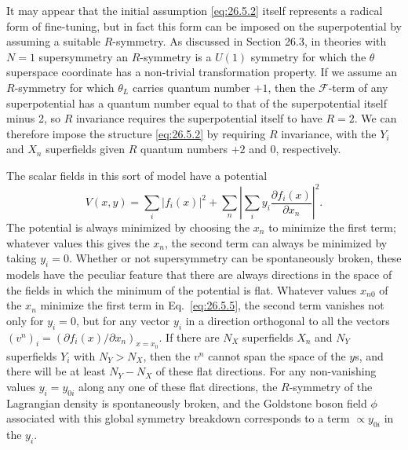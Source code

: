 It may appear that the initial assumption \eqref{eq:26.5.2} itself represents
a radical form of fine-tuning, but in fact this form can be imposed on the
superpotential by assuming a suitable $R$-symmetry. As discussed in Section
26.3, in theories with $N=1$ supersymmetry an $R$-symmetry is a $U(1)$
symmetry for which the $\theta$ superspace coordinate has a non-trivial
transformation property. If we assume an $R$-symmetry for which $\theta_L$
carries quantum number $+1$, then the $\mathcal{F}$-term of any
superpotential has a
quantum number equal to that of the superpotential itself minus 2, so $R$
invariance requires the superpotential itself to have $R=2$. We can
therefore impose the structure \eqref{eq:26.5.2} by requiring $R$ invariance,
with the $Y_i$ and $X_n$ superfields given $R$ quantum numbers $+2$ and 0,
respectively.

The scalar fields in this sort of model have a potential
\begin{equation}
  V(x,y)
  =\sum_i\lvert f_i(x)\rvert^2
   +\sum_n\left\lvert
     \sum_i y_i\frac{\partial f_i(x)}{\partial x_n}
   \right\rvert^2 .
  \tag{26.5.5}\label{eq:26.5.5}
\end{equation}
The potential is always minimized by choosing the $x_n$ to minimize the first
term; whatever values this gives the $x_n$, the second term can always be
minimized by taking $y_i=0$. Whether or not supersymmetry can be
spontaneously broken, these models have the peculiar feature that there are
always directions in the space of the fields in which the minimum of the
potential is flat. Whatever values $x_{n0}$ of the $x_n$ minimize the first
term in Eq.~\eqref{eq:26.5.5}, the second term vanishes not only for $y_i=0$,
but for any vector $y_i$ in a direction orthogonal to all the vectors
$(v^n)_i=(\partial f_i(x)/\partial x_n)_{x=x_0}$. If there are $N_X$
superfields $X_n$ and $N_Y$ superfields $Y_i$ with $N_Y>N_X$, then the $v^n$
cannot span the space of the $y$s, and there will be at least $N_Y-N_X$ of
these flat directions. For any non-vanishing values $y_i=y_{0i}$ along any
one of these flat directions, the $R$-symmetry of the Lagrangian density is
spontaneously broken, and the Goldstone boson field $\phi$ associated with
this global symmetry breakdown corresponds to a term $\propto y_{0i}$ in the
$y_i$.

